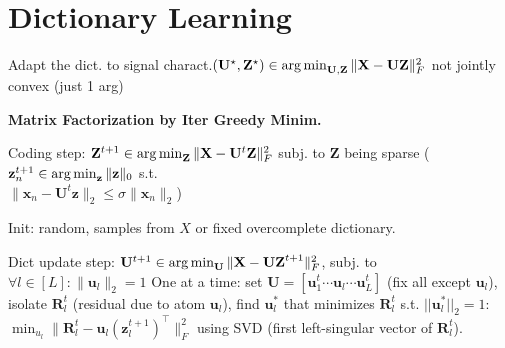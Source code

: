 \section*{Dictionary Learning}
Adapt the dict. to signal charact.$(\mathbf{U}^\star, \mathbf{Z}^\star) \in \operatorname*{arg\,min}_\mathbf{U,Z} \| \mathbf{X} - \mathbf{U}\mathbf{Z} \|_F^2$ not jointly convex (just 1 arg)

\textbf{Matrix Factorization by Iter Greedy Minim.}
\begin{inparaenum}
  \item Coding step: $\mathbf{Z}^{t+1} \in \operatorname*{arg\,min}_\mathbf{Z} \| \mathbf{X} - \mathbf{U}^t \mathbf{Z} \|_F^2$ subj. to $\mathbf{Z}$ being sparse ($\mathbf{z}_n^{t+1}\in \operatorname*{arg\,min}_\mathbf{z}\|\mathbf{z}\|_0$ s.t. \\ $\|\mathbf{x}_n - \mathbf{U}^t\mathbf{z}\|_2 \le \sigma \|\mathbf{x}_n\|_2$) 
  \item Init: random, samples from $X$ or fixed overcomplete dictionary.
  \item Dict update step: $\mathbf{U}^{t+1} \in \operatorname*{arg\,min}_\mathbf{U} \| \mathbf{X} - \mathbf{UZ}^{t+1} \|_F^2$, subj. to $\forall l\in [L]:\|\mathbf{u}_l\|_2 = 1$ One at a time: set $\mathbf{U} = [\mathbf{u}_1^t\cdots \mathbf{u}_l\cdots \mathbf{u}_L^t]$ (fix all except $\mathbf{u}_l$), isolate $\mathbf{R}_l^t$ (residual due to atom $\mathbf{u}_l$), find $\mathbf{u}_l^*$ that minimizes $\mathbf{R}_l^t$ s.t. $||\mathbf{u}_l^*||_2=1$: $\min_{u_l}\|\mathbf{R}_l^t - \mathbf{u}_l(\mathbf{z}_l^{t+1})^\top\|_F^2$ using SVD (first left-singular vector of $\mathbf{R}_l^t$).
\end{inparaenum}